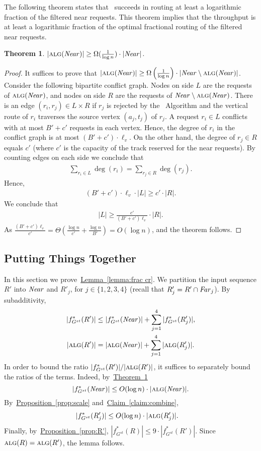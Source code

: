 \documentclass[11pt]{article}
\newtheorem{theorem}{Theorem}
\newcommand{\namedref}[2]{\hyperref[#2]{#1~\ref*{#2}}}
\newcommand{\theoremref}[1]{\namedref{Theorem}{#1}}
\newcommand{\claimref}[1]{\namedref{Claim}{#1}}
\newcommand{\lemmaref}[1]{\namedref{Lemma}{#1}}
\newcommand{\propref}[1]{\namedref{Proposition}{#1}}
\newcommand{\routenear}{\text{\sc{route-near}}\xspace}
\newcommand{\alg}{\text{\sc{alg}}}
\newenvironment{proof sketch}[1]{\noindent {\emph{Proof sketch of #1:}}}{\hfill \qed}
\newcommand{\far}{\text{\emph{Far}}\xspace}
\newcommand{\Gst}{G^{st}}
\newcommand{\near}{\text{\emph{Near}}\xspace}
\newcommand{\algn}{\alg({\near})\xspace}
\newcommand{\vl}{\ell_v}
\begin{document}
The following theorem states that \routenear\ succeeds in routing at least a
logarithmic fraction of the filtered near requests. This theorem implies that the
throughput is at least a logarithmic fraction of the optimal fractional routing of
the filtered near requests.
\begin{theorem} \label{thm:near}
$|\algn| \geq \Omega(\frac {1}{\log n}) \cdot |\near|$.
\end{theorem}
\begin{proof}\sloppy
  It suffices to prove that $|\algn| \ge \Omega \left(\frac {1}{\log n}\right) \cdot |
  \near\setminus \algn|$.  Consider the following bipartite conflict graph.  Nodes on
  side $L$ are the requests of $\algn$, and nodes on side $R$ are the requests of
  $\near\setminus \algn$.  There is an edge $(r_i,r_j)\in L\times R$ if $r_j$ is
  rejected by the \routenear\ Algorithm and the vertical route of $r_i$ traverses the
  source vertex $(a_j,t_j)$ of $r_j$.  A request $r_i\in L$ conflicts with at most
  $B'+c'$ requests in each vertex. Hence, the degree of $r_i$ in the conflict graph is
  at most $(B'+c')\cdot \vl$.  On the other hand, the degree of $r_j\in R$ equals $c'$
  (where $c'$ is the capacity of the track reserved for the near requests).
  \medskip\noindent By counting edges on each side we conclude that
\begin{align*}
\sum_{r_i\in L} \deg(r_i) = \sum_{r_j\in R} \deg(r_j).
\end{align*}
Hence,
\begin{align*}
(B'+c')\cdot \vl \cdot |L| \geq c'\cdot |R|.
\end{align*}
We conclude that
\begin{align*}
|L| \geq \frac{c'}{(B'+c')\vl} \cdot |R|.
\end{align*}
As $\frac{(B'+c')\vl}{c'}=\Theta(\frac{\log n}{c'}+ \frac{\log n}{B'})=O(\log n)$,
and the theorem follows.
\end{proof}

\subsection{Putting Things Together}\label{sec:ptt}\label{sec:together}
In this section we prove~\lemmaref{lemma:frac cr}.  We partition the input sequence
$R'$ into $\near$ and $R'_j$, for $j\in \{1,2,3,4\}$  (recall that
$R'_j=R'\cap \far_j$). By subadditivity,
\begin{align}
  \label{eq:opt sub}
  |f^*_{\Gst} (R')|&\leq   |f^*_{\Gst} (\near)| + \sum_{j=1}^4 |f^*_{\Gst} (R'_j)|,\\
  |\alg(R')| &= |\alg(\near)| + \sum_{j=1}^4 |\alg(R'_j)|.
\end{align}
In order to bound the ratio $ |f^*_{\Gst} (R')|/ |\alg(R')|$, it suffices to
separately bound the ratios of the terms. Indeed, by~\theoremref{thm:near}
 $$|f^*_{\Gst} (\near)|\leq O(\log n) \cdot |\alg(\near)|.$$
By~\propref{prop:scale} and~\claimref{claim:combine},
\begin{align*}
  |f^*_{\Gst} (R'_j)| &\leq O(\log n) \cdot |\alg(R'_j)|.
\end{align*}
Finally, by~\propref{prop:R'}, $|f^*_{\Gst} (R)| \leq  9 \cdot |f^*_{\Gst} (R')|$.
Since $\alg(R)=\alg(R')$, the lemma follows.
\end{document}
